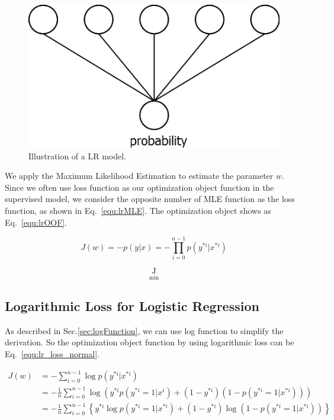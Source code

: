 \documentclass[runningheads,openany]{xhlPaper}
\begin{document}
\begin{figure}
\centering
\includegraphics[width=0.5\linewidth]{logisticRegression}
\caption{Illustration of a LR model.}
\label{fig:logisticRegression}
\end{figure}

We apply the Maximum Likelihood Estimation to estimate the parameter $w$. Since we often use loss function as our optimization object function in the supervised model, we consider the opposite number of MLE function as the loss function, as shown in Eq.~\ref{equ:lrMLE}. The optimization object shows as Eq.~\ref{equ:lrOOF}.

\begin{equation}
\label{equ:lrMLE}
{J\left( w \right)} = -p\left( {y|x} \right) = -\prod\limits_{i = 0}^{n - 1} {p\left( {{y^{*i}}|{x^{*i}}} \right)}
\end{equation}

\begin{equation}
\label{equ:lrOOF}
\mathop {J\left( w \right)}\limits_{\min }
\end{equation}

\subsection{Logarithmic Loss for Logistic Regression}
As described in Sec.\ref{sec:logFunction}, we can use log function to simplify the derivation. So the optimization object function by using logarithmic loss can be Eq.~\ref{equ:lr_loss_normal}.

\begin{equation}
\label{equ:lr_loss_normal}
\begin{aligned}
J\left( w \right) &= -\sum\limits_{i = 0}^{n - 1} {\log p\left( {{y^{*i}}|{x^{*i}}} \right)}\\
 &=  - \frac{1}{n}\sum\limits_{i = 0}^{n - 1} {\log } \left( {{y^{*i}}p\left( {{y^{*i}} = 1|{x^i}} \right) + \left( {1 - {y^{*i}}} \right)\left(1 - p\left( {{y^{*i}} = 1|{x^{*i}}} \right)\right)} \right)\\
 &=  - \frac{1}{n}\sum\limits_{i = 0}^{n - 1} \left\{{{y^{*i}}\log p\left( {{y^{*i}} = 1|{x^{*i}}} \right) + \left( {1 - {y^{*i}}} \right)\log \left(1 - p\left( {{y^{*i}} = 1|{x^{*i}}} \right) \right)}\right\} 
\end{aligned}
\end{equation}
\end{document}
